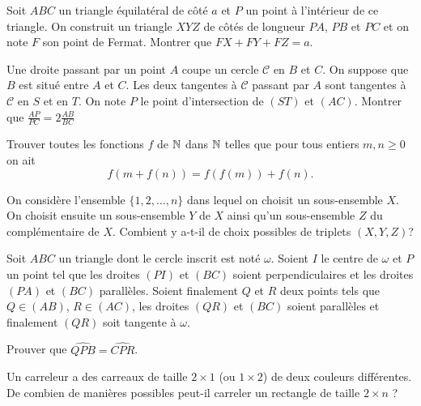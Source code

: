\begin{exo}{}
Soit $ABC$ un triangle équilatéral de côté $a$ et $P$ un point à l'intérieur de ce triangle. On construit un triangle $XYZ$ de côtés de longueur $PA$, $PB$ et $PC$ et on note $F$ son point de Fermat. Montrer que $FX+FY+FZ=a$.
\end{exo}

\begin{exo}{}
Une droite passant par un point $A$ coupe un cercle $ \mathcal{C}$ en $B$ et $C$. On suppose que $B$ est situé entre $A$ et $C$. Les deux tangentes à $ \mathcal{C}$ passant par $A$ sont tangentes à $ \mathcal{C}$ en $S$ et en $T$. On note $P$ le point d'intersection de $(ST)$ et $(AC)$. Montrer que 
$ \frac{AP}{PC}=2\frac{AB}{BC} $

\end{exo}

\begin{exo}{}Trouver toutes les fonctions $f$ de $ \mathbb{N}$ dans $ \mathbb{N}$ telles que pour tous entiers $m,n \geq 0$ on ait
$$f(m+f(n))=f(f(m))+f(n).$$
\end{exo}

\begin{exo}{}
On considère l'ensemble $ \{1,2, \ldots,n\} $ dans lequel on choisit un sous-ensemble $X$. On choisit ensuite un sous-ensemble $Y$ de $X$ ainsi qu'un sous-ensemble $Z$ du complémentaire de $X$. Combient y a-t-il de choix possibles de triplets $(X, Y, Z)$?
\end{exo}



\begin{exo}{}
Soit $ABC$ un triangle dont le cercle inscrit est noté $ \omega$. Soient $I$ le centre  de $ \omega$ et $P$ un point tel que les droites $(PI)$ et $(BC)$ soient perpendiculaires et les droites $(PA)$ et $(BC)$ parallèles. Soient finalement $Q$ et $R$ deux points tels que $Q \in (AB)$, $R \in (AC)$, les droites $(QR)$ et $(BC)$ soient parallèles et finalement $(QR)$ soit tangente à $ \omega$.

Prouver que $ \widehat {QPB}= \widehat {CPR}$.
\end{exo}

\begin{exo}{}
Un carreleur a des carreaux de taille $2 \times 1$ (ou $1 \times 2$) de deux couleurs différentes. De combien de manières possibles peut-il carreler un rectangle de taille $2 \times n$ ?
\end{exo}

